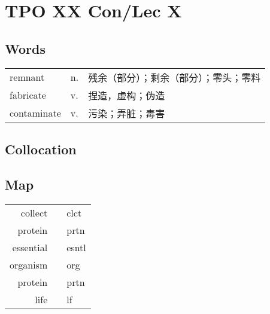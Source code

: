\section{TPO XX Con/Lec X}

\subsection{Words}

\begin{tabular}{lll}
    remnant     & n. & 残余（部分）；剩余（部分）；零头；零料 \\
    fabricate   & v. & 捏造，虚构；伪造            \\
    contaminate & v. & 污染；弄脏；毒害            \\
\end{tabular}

\subsection{Collocation}

\subsection{Map}

\begin{tabular}{rc@{\quad$\to$\quad}l}
    collect   &  & clct  \\
    protein   &  & prtn  \\
    essential &  & esntl \\
    organism  &  & org   \\
    protein   &  & prtn  \\
    life      &  & lf    \\
\end{tabular}

\newpage
